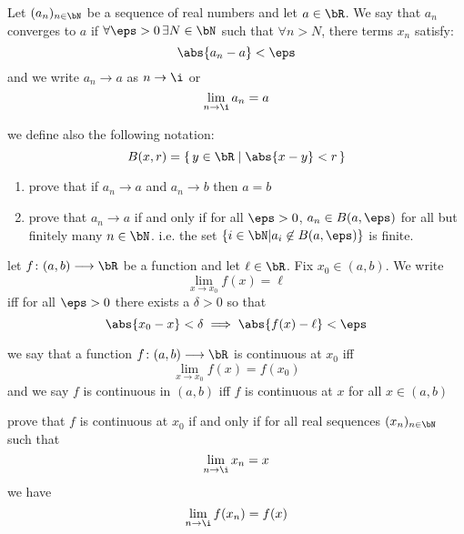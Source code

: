 \documentclass{pset}
\begin{document}
\begin{problem}
    \begin{definition}
        Let $(a_n)_{n\in\bN}$ be a sequence of real numbers and let $a\in\bR$. We say that 
        $a_n$ converges to $a$ if $\forall\eps>0\,\exists N\in\bN$ such that $\forall n>N$, 
        there terms $x_n$ satisfy:
        \[\abs{a_n-a}<\eps\]
        and we write $a_n\to a$ as $n\to\i$ or
        \[\lim_{n\to\i} a_n = a\]
    \end{definition}
    \begin{definition}
        we define also the following notation:
        \[B(x, r) = \{\, y\in\bR\mid \abs{x-y}<r\,\}\]
    \end{definition}
    \begin{enumerate}
        \item prove that if $a_n\to a$ and $a_n\to b$ then $a=b$
        \item prove that $a_n\to a$ if and only if for all $\eps>0$, $a_n\in B(a, \eps)$ for all 
        but finitely many $n\in\bN$. i.e. the set $\{i\in\bN|a_i\not\in B(a, \eps)\}$ is finite.
    \end{enumerate}
\end{problem}
\begin{problem}
    \begin{definition}
        let $f\colon (a, b)\longrightarrow\bR$ be a function and let $\ell\in\bR$. Fix $x_0\in(a, b)$. We write
        \[\lim_{x\to x_0} f(x) = \ell\] 
        iff for all $\eps>0$ there exists a $\delta>0$ so that
        \[\abs{x_0-x}<\delta \implies \abs{f(x)-\ell}<\eps\]
    \end{definition}
    \begin{definition}
        we say that a function $f\colon (a, b) \longrightarrow \bR$ is continuous at $x_0$ iff
        \[\lim_{x\to x_0} f(x) = f(x_0)\]
        and we say $f$ is continuous in $(a, b)$ iff $f$ is continuous at $x$ for all $x\in (a, b)$
    \end{definition}
    \noindent prove that $f$ is continuous at $x_0$ if and only if for all real sequences $(x_n)_{n\in\bN}$ such that
    \[\lim_{n\to \i} x_n = x\]
    we have
    \[\lim_{n\to \i} f(x_n) = f(x)\]
\end{problem}
\end{document}
